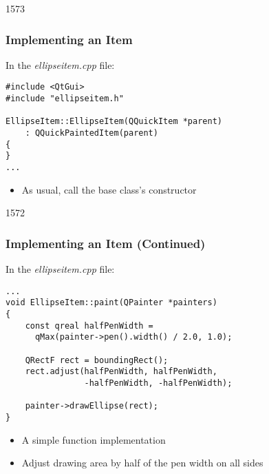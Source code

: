 \begin{slide}[fragile]{1573}\frametitle{Implementing an Item}

In the \textit{ellipseitem.cpp} file:

\vspace*{0.5em}
\begin{lstlisting}
#include <QtGui>
#include "ellipseitem.h"

EllipseItem::EllipseItem(QQuickItem *parent)
    : QQuickPaintedItem(parent)
{
}
...
\end{lstlisting}

\begin{itemize}
\item As usual, call the base class's constructor
\end{itemize}

\end{slide}

\begin{slide}[fragile]{1572}\frametitle{Implementing an Item (Continued)}

In the \textit{ellipseitem.cpp} file:

\vspace*{0.5em}
\begin{lstlisting}
...
void EllipseItem::paint(QPainter *painters)
{
    const qreal halfPenWidth =
      qMax(painter->pen().width() / 2.0, 1.0);
    
    QRectF rect = boundingRect();
    rect.adjust(halfPenWidth, halfPenWidth,
                -halfPenWidth, -halfPenWidth);
    
    painter->drawEllipse(rect);
}
\end{lstlisting}

\begin{itemize}
\item A simple  function implementation
\item Adjust drawing area by half of the pen width on all sides
\end{itemize}

\end{slide}

